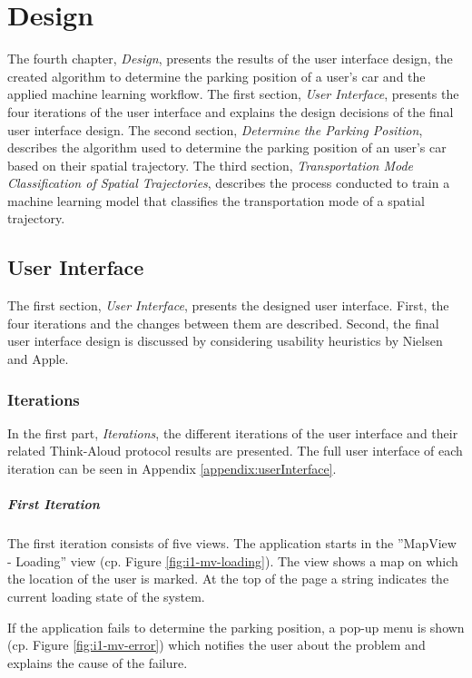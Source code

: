 \chapter{Design}
The fourth chapter, \textit{Design}, presents the results of the user interface design, the created algorithm to determine the parking position of a user's car and the applied machine learning workflow. The first section, \textit{User Interface}, presents the four iterations of the user interface and explains the design decisions of the final user interface design. The second section, \textit{Determine the Parking Position}, describes the algorithm used to determine the parking position of an user's car based on their spatial trajectory. The third section, \textit{Transportation Mode Classification of Spatial Trajectories}, describes the process conducted to train a machine learning model that classifies the transportation mode of a spatial trajectory.

\section{User Interface}
The first section, \textit{User Interface}, presents the designed user interface. First, the four iterations and the changes between them are described. Second, the final user interface design is discussed by considering usability heuristics by Nielsen and Apple.

\subsection{Iterations}
In the first part, \textit{Iterations}, the different iterations of the user interface and their related Think-Aloud protocol results are presented. The full user interface of each iteration can be seen in Appendix \ref{appendix:userInterface}.

\paragraph{First Iteration}

The first iteration consists of five views. The application starts in the ''MapView - Loading'' view (cp. Figure \ref{fig:i1-mv-loading}). The view shows a map on which the location of the user is marked. At the top of the page a string indicates the current loading state of the system.

If the application fails to determine the parking position, a pop-up menu is shown (cp. Figure \ref{fig:i1-mv-error}) which notifies the user about the problem and explains the cause of the failure. 


